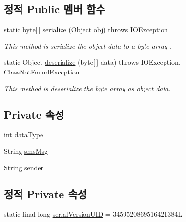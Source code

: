 \subsection*{정적 Public 멤버 함수}
\begin{DoxyCompactItemize}
\item 
static byte\mbox{[}$\,$\mbox{]} \hyperlink{classkr_1_1ac_1_1kookmin_1_1cs_1_1bluetooth_1_1_bt_data_ae0cad29a77ce0fd52299ff97b46b4a55}{serialize} (Object obj)  throws I\+O\+Exception 
\begin{DoxyCompactList}\small\item\em This method is serialize the object data to a byte array . \end{DoxyCompactList}\item 
static Object \hyperlink{classkr_1_1ac_1_1kookmin_1_1cs_1_1bluetooth_1_1_bt_data_aa48984d83a0347d73de8dc6ac706b5df}{deserialize} (byte\mbox{[}$\,$\mbox{]} data)  throws I\+O\+Exception, Class\+Not\+Found\+Exception 
\begin{DoxyCompactList}\small\item\em This method is deserialize the byte array as object data. \end{DoxyCompactList}\end{DoxyCompactItemize}
\subsection*{Private 속성}
\begin{DoxyCompactItemize}
\item 
int \hyperlink{classkr_1_1ac_1_1kookmin_1_1cs_1_1bluetooth_1_1_bt_data_ad002da4be5c1342793210a47678c1b51}{data\+Type}
\item 
String \hyperlink{classkr_1_1ac_1_1kookmin_1_1cs_1_1bluetooth_1_1_bt_data_aeca2f4bab917b5ccae3f7bed813fc2fb}{sms\+Msg}
\item 
String \hyperlink{classkr_1_1ac_1_1kookmin_1_1cs_1_1bluetooth_1_1_bt_data_ab940a1cb2ab153b6fce841ee88e07b0b}{sender}
\end{DoxyCompactItemize}
\subsection*{정적 Private 속성}
\begin{DoxyCompactItemize}
\item 
static final long \hyperlink{classkr_1_1ac_1_1kookmin_1_1cs_1_1bluetooth_1_1_bt_data_a45500b9737291a83a59755374046f647}{serial\+Version\+U\+I\+D} = 3459520869516421384\+L
\end{DoxyCompactItemize}


